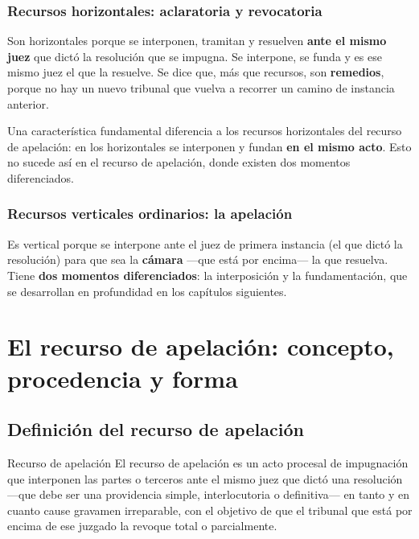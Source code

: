 \documentclass[12pt,oneside]{book}
\begin{document}
\subsection{Recursos horizontales: aclaratoria y revocatoria}

Son horizontales porque se interponen, tramitan y resuelven \textbf{ante el mismo juez} que dictó la resolución que se impugna. Se interpone, se funda y es ese mismo juez el que la resuelve. Se dice que, más que recursos, son \textbf{remedios}, porque no hay un nuevo tribunal que vuelva a recorrer un camino de instancia anterior.

\begin{important}
Una característica fundamental diferencia a los recursos horizontales del recurso de apelación: en los horizontales se interponen y fundan \textbf{en el mismo acto}. Esto no sucede así en el recurso de apelación, donde existen dos momentos diferenciados.
\end{important}

\subsection{Recursos verticales ordinarios: la apelación}

Es vertical porque se interpone ante el juez de primera instancia (el que dictó la resolución) para que sea la \textbf{cámara} —que está por encima— la que resuelva. Tiene \textbf{dos momentos diferenciados}: la interposición y la fundamentación, que se desarrollan en profundidad en los capítulos siguientes.

\chapter{El recurso de apelación: concepto, procedencia y forma}

\section{Definición del recurso de apelación}

\begin{definition}{Recurso de apelación}
El recurso de apelación es un acto procesal de impugnación que interponen las partes o terceros ante el mismo juez que dictó una resolución —que debe ser una providencia simple, interlocutoria o definitiva— en tanto y en cuanto cause gravamen irreparable, con el objetivo de que el tribunal que está por encima de ese juzgado la revoque total o parcialmente.
\end{definition}
\end{document}
